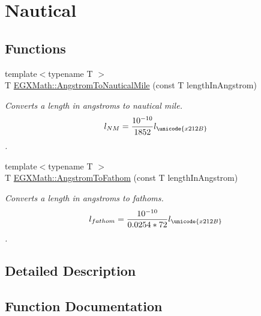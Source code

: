 \hypertarget{group___e_g_x_math-_conversions-_length_conversions-_non-_s_i-_angstrom-_nautical}{}\section{Nautical}
\label{group___e_g_x_math-_conversions-_length_conversions-_non-_s_i-_angstrom-_nautical}
\subsection*{Functions}
\begin{DoxyCompactItemize}
\item 
{\footnotesize template$<$typename T $>$ }\\T \mbox{\hyperlink{group___e_g_x_math-_conversions-_length_conversions-_non-_s_i-_angstrom-_nautical_ga4be465819cdcbfd7da046440844f5d82}{E\+G\+X\+Math\+::\+Angstrom\+To\+Nautical\+Mile}} (const T length\+In\+Angstrom)
\begin{DoxyCompactList}\small\item\em Converts a length in angstroms to nautical mile. \[ l_{NM}= \frac{10^{-10}}{1852} l_{\unicode{x212B}} \]. \end{DoxyCompactList}\item 
{\footnotesize template$<$typename T $>$ }\\T \mbox{\hyperlink{group___e_g_x_math-_conversions-_length_conversions-_non-_s_i-_angstrom-_nautical_gab7a96e419622057d8fcce5af11ae0a9a}{E\+G\+X\+Math\+::\+Angstrom\+To\+Fathom}} (const T length\+In\+Angstrom)
\begin{DoxyCompactList}\small\item\em Converts a length in angstroms to fathoms. \[ l_{fathom}= \frac{10^{-10}}{0.0254 * 72} l_{\unicode{x212B}} \]. \end{DoxyCompactList}\end{DoxyCompactItemize}


\subsection{Detailed Description}


\subsection{Function Documentation}
\mbox{\label{group___e_g_x_math-_conversions-_length_conversions-_non-_s_i-_angstrom-_nautical_gab7a96e419622057d8fcce5af11ae0a9a}} 
